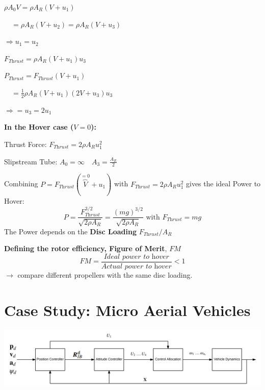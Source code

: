 \documentclass[fontsize=6pt,DIV=calc,a4paper,ngerman]{scrartcl}
\begin{document}
\begin{multicols*}{4}
\begin{minipage}{0.6\linewidth}
		$\rho A_0 V = \rho A_R (V+u_1)$

		$\quad = \rho A_R (V+u_2)= \rho A_R (V+u_3)$

		$\Rightarrow u_1=u_2$

		\smallskip
		$F_{\textit{Thrust}} = \rho A_R(V+u_1)u_3$

		$P_{\textit{Thrust}} = F_{\textit{Thrust}}(V+u_1) $

		$\quad= \frac{1}{2}\rho A_R(V+u_1)(2V+u_3)u_3$

		$\Rightarrow = u_3 = 2u_1$

		\smallskip
		\textbf{In the Hover case ($V=0$):}

		Thrust Force: $F_{\textit{Thrust}} = 2\rho A_Ru_1^2$

		Slipstream Tube: $A_0 = \infty \quad A_3 = \frac{A_R}{2}$
	\end{minipage}

	Combining $P=F_{\textit{Thrust}}(\overbrace{V}^{=0}+u_1)$ with $F_{\textit{Thrust}}=2\rho A_Ru_1^2$ gives the ideal Power to Hover:
	$$P=\frac{F_{\textit{Thrust}}^{3/2}}{\sqrt{2\rho A_R}} = \frac{(mg)^{3/2}}{\sqrt{2\rho A_R}} \text{ with } F_{\textit{Thrust}} = mg$$
	The Power depends on the \textbf{Disc Loading} $F_{\textit{Thrust}}/A_R$

	\smallskip
	\textbf{Defining the rotor efficiency, Figure of Merit}, $FM$\\
	$$FM = \frac{\textit{Ideal power to hover}}{\textit{Actual power to hover}}<1$$
	$\rightarrow$ compare different propellers with the same disc loading.

	\section{Case Study: Micro Aerial Vehicles}
	\includegraphics[width = \linewidth]{CaseControlArch.png}

\end{multicols*}
\end{document}
